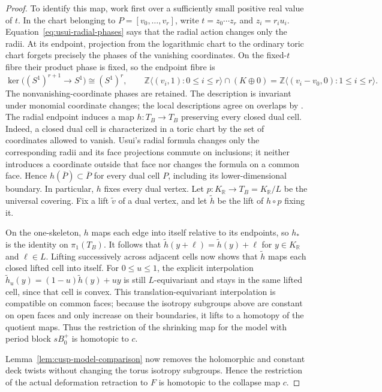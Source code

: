 \documentclass[11pt]{article}
\theoremstyle{definition}
\theoremstyle{remark}
\numberwithin{equation}{section}
\begin{document}
\begin{proof}
To identify this map, work first over a sufficiently small positive real
value of $t$.  In the chart belonging to
$P=[v_0,\ldots,v_r]$, write $t=z_0\cdots z_r$ and
$z_i=r_iu_i$.  Equation~\eqref{eq:usui-radial-phases} says that the
radial action changes only the radii.  At its endpoint, projection from the
logarithmic chart to the ordinary toric chart forgets precisely the phases
of the vanishing coordinates.  On the fixed-$t$ fibre their product phase
is fixed, so the endpoint fibre is
\[
 \ker\bigl((S^1)^{r+1}\longrightarrow S^1\bigr)\cong(S^1)^r,
 \qquad
 \mathbb Z\langle(v_i,1):0\leq i\leq r\rangle\cap(K\oplus0)
 =\mathbb Z\langle(v_i-v_0,0):1\leq i\leq r\rangle.
\]
The nonvanishing-coordinate phases are retained.  The description is
invariant under monomial coordinate changes; the local descriptions agree on
overlaps by \citep[p.~30, Claim~2 following (5.2.12)]{Usui2001}.  The radial endpoint
induces a map
$h:T_B\to T_B$ preserving every closed dual cell.  Indeed, a closed dual
cell is characterized in a toric chart by the set of coordinates allowed to
vanish.  Usui's radial formula changes only the corresponding radii and its
face projections commute on inclusions; it neither introduces a coordinate
 outside that face nor changes the formula on a common face.  Hence
$h(\overline P)\subset\overline P$ for every dual cell $P$, including
its lower-dimensional boundary.  In particular, $h$ fixes every dual
vertex.  Let $p:K_{\mathbb R}\to T_B=K_{\mathbb R}/L$ be the universal
covering.  Fix a lift $\widetilde v$ of a dual vertex, and let $\widetilde h$
be the lift of $h\circ p$ fixing it.

On the one-skeleton, $h$
maps each edge into itself relative to its endpoints, so $h_*$ is the
identity on $\pi_1(T_B)$.  It follows that
$\widetilde h(y+\ell)=\widetilde h(y)+\ell$ for
$y\in K_{\mathbb R}$ and $\ell\in L$.
Lifting successively across adjacent cells now shows that
$\widetilde h$ maps each closed lifted cell into itself.
For $0\leq u\leq1$, the explicit interpolation
$\widetilde h_u(y)=(1-u)\widetilde h(y)+uy$
is still $L$-equivariant and stays in the same lifted cell, since that cell
is convex.  This translation-equivariant interpolation is compatible on common faces;
because the isotropy subgroups above are constant on open faces and only
increase on their boundaries, it lifts to a homotopy of the quotient maps.
Thus the restriction of the shrinking map for the model with period block
$sB_0^+$ is homotopic to $c$.

Lemma~\ref{lem:cusp-model-comparison} now removes the holomorphic and constant
deck twists without changing the torus isotropy subgroups.  Hence the
restriction of the actual deformation retraction to $F$ is homotopic to
the collapse map $c$.


\end{proof}
\end{document}

